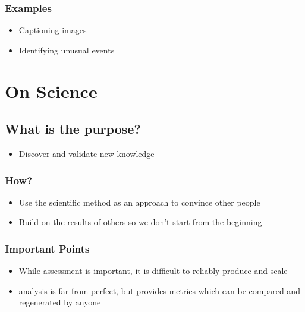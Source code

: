 \documentclass[letterpaper,10pt,english]{sphinxmanual}
\begin{document}
\subsection{Examples}
\label{\detokenize{01-Introduction:id4}}\begin{itemize}
\item {} 
\sphinxAtStartPar
Captioning images

\item {} 
\sphinxAtStartPar
Identifying unusual events

\end{itemize}




\chapter{On Science}
\label{\detokenize{01-Introduction:on-science}}

\section{What is the purpose?}
\label{\detokenize{01-Introduction:what-is-the-purpose}}\begin{itemize}
\item {} 
\sphinxAtStartPar
Discover and validate new knowledge

\end{itemize}


\subsection{How?}
\label{\detokenize{01-Introduction:how}}\begin{itemize}
\item {} 
\sphinxAtStartPar
Use the scientific method as an approach to convince other people

\item {} 
\sphinxAtStartPar
Build on the results of others so we don’t start from the beginning

\end{itemize}


\subsection{Important Points}
\label{\detokenize{01-Introduction:important-points}}\begin{itemize}
\item {} 
\sphinxAtStartPar
While  assessment is important, it is difficult to reliably produce and scale

\item {} 
\sphinxAtStartPar
{} analysis is far from perfect, but provides metrics which can be compared and regenerated by anyone

\end{itemize}
\end{document}
